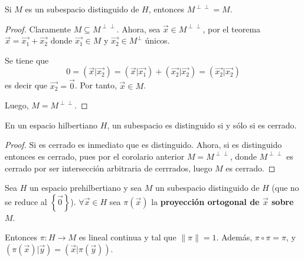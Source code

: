 \documentclass[12pt]{report}
\theoremstyle{largebreak}
\newcommand\cf[3]{\ensuremath{#1:#2\rightarrow#3}}
\newcommand\norm[1]{\ensuremath{\|#1\|}}
\newcommand\pint[2]{\ensuremath{\left(#1\big| #2\right)}}
\begin{document}
    \begin{propo}
        Si $M$ es un subespacio distinguido de $H$, entonces $M^{\perp\perp}=M$.
    \end{propo}

    \begin{proof}
        Claramente $M\subseteq M^{\perp\perp}$. Ahora, sea $\vec{x}\in M^{\perp\perp}$, por el teorema $\vec{x}=\vec{x_1}+\vec{x_2}$ donde $\vec{x_1}\in M$ y $\vec{x_2}\in M^\perp$ únicos.

        Se tiene que
        \begin{equation*}
            0=\pint{\vec{x}}{\vec{x_2}}=\pint{\vec{x}}{\vec{x_1}}+\pint{\vec{x_2}}{\vec{x_2}}=\pint{\vec{x_2}}{\vec{x_2}}
        \end{equation*}
        es decir que $\vec{x_2}=\vec{0}$. Por tanto, $\vec{x}\in M$.

        Luego, $M=M^{\perp\perp}$.
    \end{proof}

    \begin{cor}
        En un espacio hilbertiano $H$, un subespacio es distinguido si y sólo si es cerrado.
    \end{cor}

    \begin{proof}
        Si es cerrado es inmediato que es distinguido. Ahora, si es distinguido entonces es cerrado, pues por el corolario anterior $M=M^{\perp\perp}$, donde $M^{\perp\perp}$ es cerrado por ser intersección arbitraria de cerrrados, luego $M$ es cerrado.
    \end{proof}

    \begin{propo}
        Sea $H$ un espacio prehilbertiano y sea $M$ un subespacio distinguido de $H$ (que no se reduce al $\left\{\vec{0} \right\}$). $\forall\vec{x}\in H$ sea $\pi(\vec{x})$ la \textbf{proyección ortogonal de $\vec{x}$ sobre $M$}.

        Entonces $\cf{\pi}{H}{M}$ es lineal continua y tal que $\norm{\pi}=1$. Además, $\pi\circ\pi=\pi$, y $\pint{\pi(\vec{x})}{\vec{y}}=\pint{\vec{x}}{\pi(\vec{y})}$.
    \end{propo}
\end{document}
